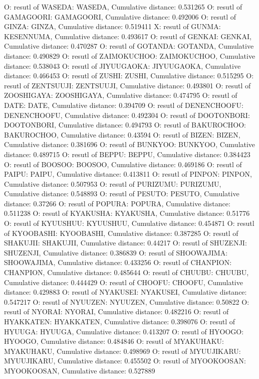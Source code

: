 O: resutl of WASEDA: WASEDA, Cumulative distance: 0.531265
O: resutl of GAMAGOORI: GAMAGOORI, Cumulative distance: 0.492006
O: resutl of GINZA: GINZA, Cumulative distance: 0.519411
X: resutl of GUNMA: KESENNUMA, Cumulative distance: 0.493617
O: resutl of GENKAI: GENKAI, Cumulative distance: 0.470287
O: resutl of GOTANDA: GOTANDA, Cumulative distance: 0.490829
O: resutl of ZAIMOKUCHOO: ZAIMOKUCHOO, Cumulative distance: 0.538043
O: resutl of JIYUUGAOKA: JIYUUGAOKA, Cumulative distance: 0.466453
O: resutl of ZUSHI: ZUSHI, Cumulative distance: 0.515295
O: resutl of ZENTSUUJI: ZENTSUUJI, Cumulative distance: 0.493801
O: resutl of ZOOSHIGAYA: ZOOSHIGAYA, Cumulative distance: 0.474795
O: resutl of DATE: DATE, Cumulative distance: 0.394709
O: resutl of DENENCHOOFU: DENENCHOOFU, Cumulative distance: 0.492304
O: resutl of DOOTONBORI: DOOTONBORI, Cumulative distance: 0.494793
O: resutl of BAKUROCHOO: BAKUROCHOO, Cumulative distance: 0.43594
O: resutl of BIZEN: BIZEN, Cumulative distance: 0.381696
O: resutl of BUNKYOO: BUNKYOO, Cumulative distance: 0.489715
O: resutl of BEPPU: BEPPU, Cumulative distance: 0.384423
O: resutl of BOOSOO: BOOSOO, Cumulative distance: 0.469186
O: resutl of PAIPU: PAIPU, Cumulative distance: 0.413811
O: resutl of PINPON: PINPON, Cumulative distance: 0.507953
O: resutl of PURIZUMU: PURIZUMU, Cumulative distance: 0.548893
O: resutl of PESUTO: PESUTO, Cumulative distance: 0.37266
O: resutl of POPURA: POPURA, Cumulative distance: 0.511238
O: resutl of KYAKUSHA: KYAKUSHA, Cumulative distance: 0.51776
O: resutl of KYUUSHUU: KYUUSHUU, Cumulative distance: 0.454871
O: resutl of KYOOBASHI: KYOOBASHI, Cumulative distance: 0.387285
O: resutl of SHAKUJII: SHAKUJII, Cumulative distance: 0.44217
O: resutl of SHUZENJI: SHUZENJI, Cumulative distance: 0.386839
O: resutl of SHOOWAJIMA: SHOOWAJIMA, Cumulative distance: 0.433256
O: resutl of CHANPION: CHANPION, Cumulative distance: 0.485644
O: resutl of CHUUBU: CHUUBU, Cumulative distance: 0.444429
O: resutl of CHOOFU: CHOOFU, Cumulative distance: 0.429883
O: resutl of NYAKUSEI: NYAKUSEI, Cumulative distance: 0.547217
O: resutl of NYUUZEN: NYUUZEN, Cumulative distance: 0.50822
O: resutl of NYORAI: NYORAI, Cumulative distance: 0.482216
O: resutl of HYAKKATEN: HYAKKATEN, Cumulative distance: 0.398076
O: resutl of HYUUGA: HYUUGA, Cumulative distance: 0.413207
O: resutl of HYOOGO: HYOOGO, Cumulative distance: 0.484846
O: resutl of MYAKUHAKU: MYAKUHAKU, Cumulative distance: 0.498969
O: resutl of MYUUJIKARU: MYUUJIKARU, Cumulative distance: 0.455502
O: resutl of MYOOKOOSAN: MYOOKOOSAN, Cumulative distance: 0.527889
